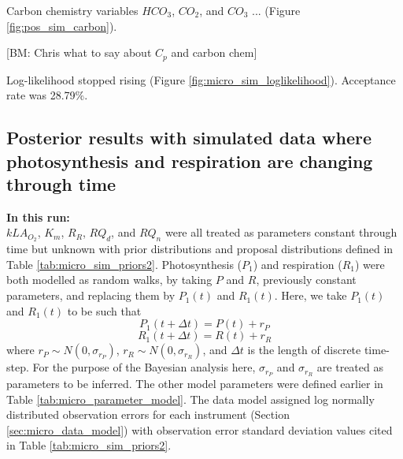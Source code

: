\documentclass{ruthesis}
\begin{document}
Carbon chemistry variables $HCO_3$, $CO_2$, and $CO_3$ ... (Figure \ref{fig:pos_sim_carbon}).

[BM: Chris what to say about $C_p$ and carbon chem]

Log-likelihood stopped rising (Figure \ref{fig:micro_sim_loglikelihood}).
Acceptance rate was 28.79\%.

\FloatBarrier
\subsection{Posterior results with simulated data where photosynthesis and respiration are changing through time}\label{sec:micro_sim_results2}

\textbf{In this run:}\\
$kLA_{O_2}$, $K_m$, $R_R$, $RQ_d$, and $RQ_n$ were all treated as parameters constant through time but unknown with prior distributions and proposal distributions defined in Table \ref{tab:micro_sim_priors2}.
Photosynthesis ($P_1$) and respiration ($R_1$) were both modelled as random walks, by taking \begin{math}P\end{math} and \begin{math}R\end{math}, previously constant parameters, and replacing them by \begin{math}P_1(t)\end{math} and \begin{math}R_1(t)\end{math}. Here, we take \begin{math}P_1(t)\end{math} and \begin{math}R_1(t)\end{math} to be such that
\begin{displaymath}
P_1(t+\Delta t) = P(t) + r_P
\end{displaymath}
\begin{displaymath}
R_1(t+\Delta t) = R(t) + r_R
\end{displaymath}
where \begin{math}
r_P \sim N(0, \sigma_{r_P})
\end{math}, \begin{math}
r_R \sim N(0, \sigma_{r_R})
\end{math}, and \begin{math}
\Delta t
\end{math} is the length of discrete time-step. For the purpose of the Bayesian analysis here, \begin{math}\sigma_{r_P}\end{math} and \begin{math}\sigma_{r_R}\end{math} are treated as parameters to be inferred. 
The other model parameters were defined earlier in Table \ref{tab:micro_parameter_model}.
The data model assigned log normally distributed observation errors for each instrument (Section \ref{sec:micro_data_model}) with observation error standard deviation values cited in Table \ref{tab:micro_sim_priors2}.
\end{document}
